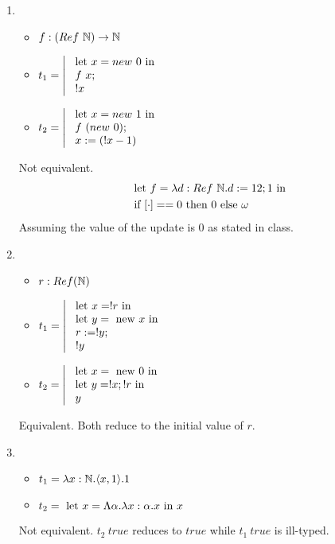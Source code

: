 \documentclass{article}
\begin{document}
\begin{enumerate}
    \item 
        \begin{itemize}
            \item $f:(Ref\ \mathbb N)\to\mathbb N$
            \item $t_1=\left|\begin{array}{l}\LET x= new\ 0 \TIN\\\ f\ x;\\\ !x\end{array}\right.$
            \item $t_2=\left|\begin{array}{l}\LET x= new\ 1 \TIN\\\ f\ (new\ 0);\\\ x:=(!x-1)\end{array}\right.$
        \end{itemize}
        Not equivalent.
        \begin{align*}
            & \LET f = \lam{d:Ref\ \N}{d:=12;1} \TIN \\
            & \IF [\cdot] == 0 \THEN 0 \ELSE \omega
        \end{align*}
        Assuming the value of the update is $0$ as stated in class.

    \item 
        \begin{itemize}
            \item $r:Ref(\mathbb N)$
            \item $t_1=\left|\begin{array}{l}\LET x=!r \TIN\\ \LET y=\NEW x \TIN\\\ r:=!y;\\\ !y\end{array}\right.$
            \item $t_2=\left|\begin{array}{l}\text{ let } x=\text{ new } 0 \text{ in } \\ \text{ let } y=!x;!r \text{ in }\\\ y\end{array}\right.$
        \end{itemize}
        Equivalent. Both reduce to the initial value of $r$.

    \item 
        \begin{itemize}
            \item $t_1 = \lam{x:\N}{\pair{x,1}}.1$
            \item $t_2 = \text{ let } x = \Lambda\alpha.\lambda x:\alpha.x\text{ in } x$
        \end{itemize}
        Not equivalent. $t_2\ true$ reduces to $true$ while $t_1\ true$ is ill-typed.
\end{enumerate}
\end{document}
